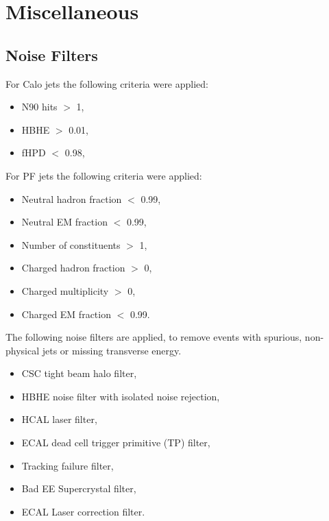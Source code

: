 
\chapter{Miscellaneous}
\section{Noise Filters}
\label{app:noise}

For Calo jets the following criteria were applied:

\begin{itemize}
  \item N90 hits $>$ 1, 
    \item  HBHE $>$ 0.01,
      \item fHPD $<$ 0.98,
\end{itemize}

For PF jets the following criteria were applied:
  
\begin{itemize}
  \item Neutral hadron fraction $<$ 0.99, 
    \item  Neutral EM fraction $<$ 0.99,
      \item Number of constituents $>$ 1,
        \item Charged hadron fraction $>$ 0,
          \item Charged multiplicity $>$ 0,
            \item Charged EM fraction $<$ 0.99.
\end{itemize}
  
The following noise filters are applied, to remove events with spurious, non-physical jets or missing transverse energy.

\begin{itemize}
  \item CSC tight beam halo filter,
    \item HBHE noise filter with isolated noise rejection,
      \item HCAL laser filter,
        \item ECAL dead cell trigger primitive (TP) filter,
          \item Tracking failure filter,
            \item Bad EE Supercrystal filter,
              \item ECAL Laser correction filter.
\end{itemize}

